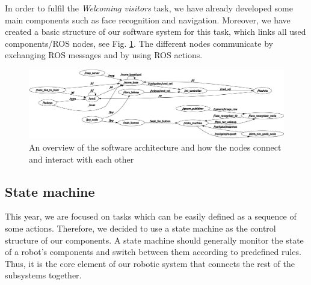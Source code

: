 \documentclass[conference]{IEEEtran}
\begin{document}
In order to fulfil the \textit{Welcoming visitors} task, we have already developed some main components such as face recognition and navigation. Moreover, we have created a basic structure of our software system for this task, which links all used components/ROS nodes, see Fig. \ref{fig:nodes}. The different nodes communicate by exchanging ROS messages and by using ROS actions.

\begin{figure}[!t]
\centering
\includegraphics[width=\textwidth]{nodes_cut.png}
\caption{An overview of the software architecture and how the nodes connect and interact with each other}
\label{fig:nodes}
\end{figure}

\subsection{State machine}
This year, we are focused on tasks which can be easily defined as a sequence of some actions. Therefore, we decided to use a state machine as the control structure of our components. A state machine should generally monitor the state of a robot's components and switch between them according to predefined rules. Thus, it is the core element of our robotic system that connects the rest of the subsystems together.
\end{document}
